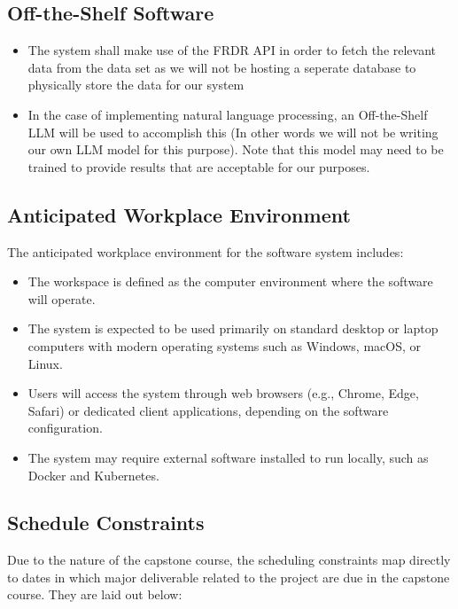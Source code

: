 \documentclass[12pt]{article}
\begin{document}
\subsection{Off-the-Shelf Software}

\begin{itemize}
    \item The system shall make use of the FRDR API in order to fetch the relevant data from the data set as we will not be hosting a seperate database to physically store the data for our system
    \item In the case of implementing natural language processing, an Off-the-Shelf LLM will be used to accomplish this (In other words we will not be writing our own LLM model for this purpose).
    Note that this model may need to be trained to provide results that are acceptable for our purposes.
\end{itemize}

\subsection{Anticipated Workplace Environment}

The anticipated workplace environment for the software system includes:

\begin{itemize}
    \item The workspace is defined as the computer environment where the software will operate.
    \item The system is expected to be used primarily on standard desktop or laptop computers with modern operating systems such as Windows, macOS, or Linux.
    \item Users will access the system through web browsers (e.g., Chrome, Edge, Safari) or dedicated client applications, depending on the software configuration.
    \item The system may require external software installed to run locally, such as Docker and Kubernetes.
\end{itemize}

\subsection{Schedule Constraints}

\par{Due to the nature of the capstone course, the scheduling constraints
map directly to dates in which major deliverable related to the project are due in the capstone course.
They are laid out below:}
\end{document}
